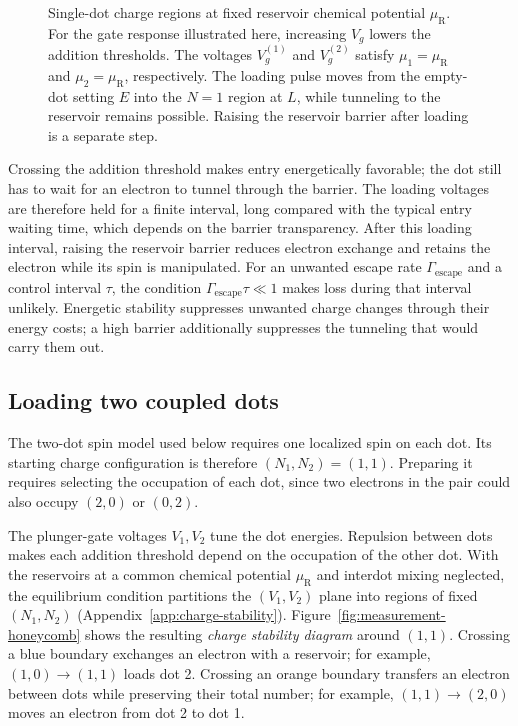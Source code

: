 \begin{figure}[htbp]
 \centering
 
 \caption{Single-dot charge regions at fixed reservoir chemical
 potential $\mu_{\mathrm R}$. For the gate response illustrated here,
 increasing $V_g$ lowers the addition thresholds. The voltages
 $V_g^{(1)}$ and $V_g^{(2)}$ satisfy $\mu_1=\mu_{\mathrm R}$ and
 $\mu_2=\mu_{\mathrm R}$, respectively. The loading pulse moves from
 the empty-dot setting $E$ into the $N=1$ region at $L$, while
 tunneling to the reservoir remains possible. Raising the reservoir
 barrier after loading is a separate step.}
 \label{fig:single-dot-loading}
\end{figure}

Crossing the addition threshold makes entry energetically favorable;
the dot still has to wait for an electron to tunnel through the
barrier. The loading voltages are therefore held for a finite
interval, long compared with the typical entry waiting time, which
depends on the barrier transparency. After this loading interval,
raising the reservoir barrier reduces electron exchange and retains
the electron while its spin is manipulated. For an unwanted escape
rate $\Gamma_{\mathrm{escape}}$ and a control interval $\tau$, the
condition $\Gamma_{\mathrm{escape}}\tau\ll1$ makes loss during that
interval unlikely. Energetic stability suppresses unwanted charge
changes through their energy costs; a high barrier additionally
suppresses the tunneling that would carry them out.

\FloatBarrier
\subsection{Loading two coupled dots}
\label{sec:double-dot-loading}

The two-dot spin model used below requires one localized spin on
each dot. Its starting charge configuration is therefore $(N_1,N_2)=(1,1)$.
Preparing it requires selecting the occupation of each dot, since
two electrons in the pair could also occupy $(2,0)$ or $(0,2)$.

The plunger-gate voltages $V_1,V_2$ tune the dot energies. Repulsion
between dots makes each addition threshold depend on the occupation
of the other dot. With the reservoirs at a common chemical potential
$\mu_{\mathrm R}$ and interdot mixing neglected, the equilibrium
condition partitions the $(V_1,V_2)$ plane into regions of fixed
$(N_1,N_2)$ (Appendix~\ref{app:charge-stability}).
Figure~\ref{fig:measurement-honeycomb} shows the resulting
\emph{charge stability diagram} around $(1,1)$. Crossing a blue
boundary exchanges an electron with a reservoir; for example,
$(1,0)\to(1,1)$ loads dot 2. Crossing an orange boundary transfers
an electron between dots while preserving their total number;
for example, $(1,1)\to(2,0)$ moves an electron from dot 2 to dot 1.

